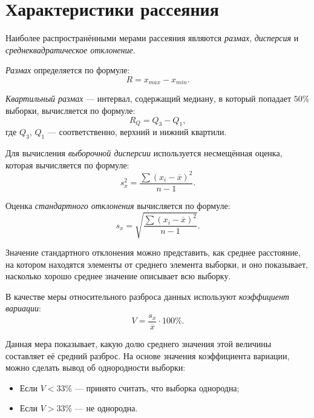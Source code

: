 \section*{Характеристики рассеяния}

Наиболее распространёнными мерами рассеяния являются \textit{размах}, \textit{дисперсия} и \textit{среднеквадратическое отклонение}.

\textit{Размах} определяется по формуле:
\begin{equation*}
	R = x_{max} - x_{min}.
\end{equation*}

\textit{Квартильный размах} --- интервал, содержащий медиану, в который попадает $50\%$ выборки, вычисляется по формуле: 
\begin{equation*}
	R_Q = Q_3 - Q_1,
\end{equation*}
где $Q_3$, $Q_1$ --- соответственно, верхний и нижний квартили.

Для вычисления \textit{выборочной дисперсии} используется несмещённая оценка, которая вычисляется по формуле:
\begin{equation*}
	s_x^2 = \frac{\sum{(x_i - \overline{x})^2}}{n - 1}.
\end{equation*}

Оценка \textit{стандартного отклонения} вычисляется по формуле:
\begin{equation*}
	s_x = \sqrt{\frac{\sum{(x_i - \overline{x})^2}}{n - 1}}.
\end{equation*}

Значение стандартного отклонения можно представить, как среднее расстояние, на котором находятся элементы от среднего элемента выборки, и оно показывает, насколько хорошо среднее значение описывает всю выборку.

В качестве меры относительного разброса данных используют \textit{коэффициент вариации}:
\begin{equation*}
	V = \frac{s_x}{\overline{x}} \cdot 100\%.
\end{equation*}

Данная мера показывает, какую долю среднего значения этой величины составляет её средний разброс. На основе значения коэффициента вариации, можно сделать вывод об однородности выборки: 
\begin{itemize}
	\item Если $V < 33\%$ --- принято считать, что выборка однородна;
	\item Если $V > 33\%$ --- не однородна.
\end{itemize}

